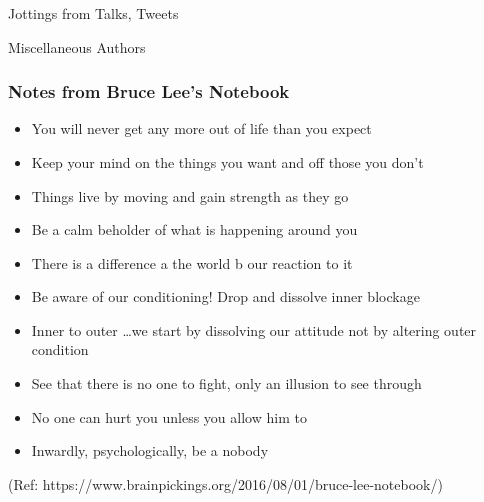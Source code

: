 \begin{frame}[fragile]\frametitle{}
\begin{center}
{\Large Jottings from Talks, Tweets}

{\small Miscellaneous Authors }


\end{center}
\end{frame}

\begin{frame}[fragile]\frametitle{ Notes from Bruce Lee's Notebook }

	\begin{itemize}
	\item You will never get any more out of life than you expect
	\item Keep your mind on the things you want and off those you don’t
	\item Things live by moving and gain strength as they go
	\item Be a calm beholder of what is happening around you
	\item There is a difference a\) the world b\) our reaction to it
	\item Be aware of our conditioning! Drop and dissolve inner blockage
	\item Inner to outer \ldots we start by dissolving our attitude not by altering outer condition
	\item See that there is no one to fight, only an illusion to see through
	\item No one can hurt you unless you allow him to
	\item Inwardly, psychologically, be a nobody
	\end{itemize}

{\tiny (Ref: https://www.brainpickings.org/2016/08/01/bruce-lee-notebook/)}

\end{frame}


